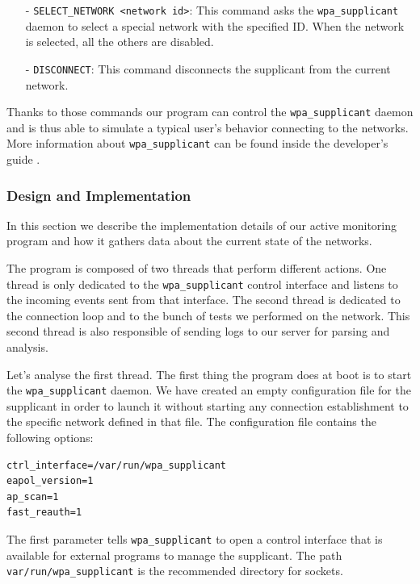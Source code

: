 \begin{itemize}
	\item[-] \texttt{SELECT\_NETWORK <network id>}: This command asks the \texttt{wpa\_supplicant} daemon to select a special network with the specified ID. When the network is selected, all the others are disabled.

	\item[-] \texttt{DISCONNECT}: This command disconnects the supplicant from the current network.
\end{itemize}

Thanks to those commands our program can control the \texttt{wpa\_supplicant} daemon and is thus able to simulate a typical user's behavior connecting to the networks. More information about \texttt{wpa\_supplicant} can be found inside the developer's guide \cite{wpa-supplicant-devel}.


\subsubsection{Design and Implementation}
In this section we describe the implementation details of our active monitoring program and how it gathers data about the current state of the networks.

The program is composed of two threads that perform different actions. One thread is only dedicated to the \texttt{wpa\_supplicant} control interface and listens to the incoming events sent from that interface. The second thread is dedicated to the connection loop and to the bunch of tests we performed on the network. This second thread is also responsible of sending logs to our server for parsing and analysis.

Let's analyse the first thread. The first thing the program does at boot is to start the \texttt{wpa\_supplicant} daemon. We have created an empty configuration file for the supplicant in order to launch it without starting any connection establishment to the specific network defined in that file. The configuration file contains the following options:\\

\begin{lstlisting}[frame=single,breaklines=true,caption={\texttt{wpa\_supplicant.conf}}]
ctrl_interface=/var/run/wpa_supplicant
eapol_version=1
ap_scan=1
fast_reauth=1
\end{lstlisting}

\par The first parameter tells \texttt{wpa\_supplicant} to open a control interface that is available for external programs to manage the supplicant. The path \texttt{var/run/wpa\_supplicant} is the recommended directory for sockets. 

